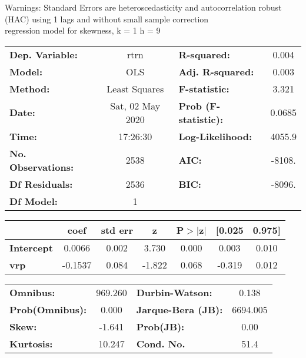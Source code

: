 Warnings: \newline
 [1] Standard Errors are heteroscedasticity and autocorrelation robust (HAC) using 1 lags and without small sample correction\\ 

regression model for skewness, k = 1 h = 9\begin{center}
\begin{tabular}{lclc}
\toprule
\textbf{Dep. Variable:}    &       rtrn       & \textbf{  R-squared:         } &     0.004   \\
\textbf{Model:}            &       OLS        & \textbf{  Adj. R-squared:    } &     0.003   \\
\textbf{Method:}           &  Least Squares   & \textbf{  F-statistic:       } &     3.321   \\
\textbf{Date:}             & Sat, 02 May 2020 & \textbf{  Prob (F-statistic):} &   0.0685    \\
\textbf{Time:}             &     17:26:30     & \textbf{  Log-Likelihood:    } &    4055.9   \\
\textbf{No. Observations:} &        2538      & \textbf{  AIC:               } &    -8108.   \\
\textbf{Df Residuals:}     &        2536      & \textbf{  BIC:               } &    -8096.   \\
\textbf{Df Model:}         &           1      & \textbf{                     } &             \\
\bottomrule
\end{tabular}
\begin{tabular}{lcccccc}
                   & \textbf{coef} & \textbf{std err} & \textbf{z} & \textbf{P$> |$z$|$} & \textbf{[0.025} & \textbf{0.975]}  \\
\midrule
\textbf{Intercept} &       0.0066  &        0.002     &     3.730  &         0.000        &        0.003    &        0.010     \\
\textbf{vrp}       &      -0.1537  &        0.084     &    -1.822  &         0.068        &       -0.319    &        0.012     \\
\bottomrule
\end{tabular}
\begin{tabular}{lclc}
\textbf{Omnibus:}       & 969.260 & \textbf{  Durbin-Watson:     } &    0.138  \\
\textbf{Prob(Omnibus):} &   0.000 & \textbf{  Jarque-Bera (JB):  } & 6694.005  \\
\textbf{Skew:}          &  -1.641 & \textbf{  Prob(JB):          } &     0.00  \\
\textbf{Kurtosis:}      &  10.247 & \textbf{  Cond. No.          } &     51.4  \\
\bottomrule
\end{tabular}
\end{center}

